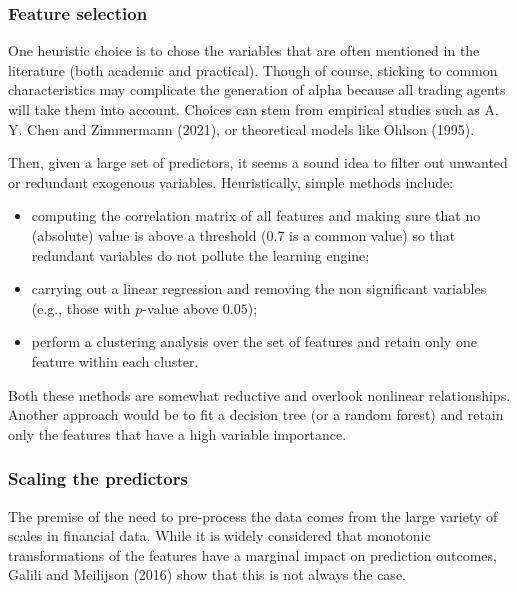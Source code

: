 \subsubsection{Feature selection}
One heuristic choice is to chose the variables that are often mentioned in the literature (both academic and practical). Though of course, sticking to common characteristics may complicate the generation of alpha because all trading agents will take them into account. Choices can stem from empirical studies such as A. Y. Chen and Zimmermann (2021), or theoretical models like Ohlson (1995). 

Then, given a large set of predictors, it seems a sound idea to filter out unwanted or redundant exogenous variables. Heuristically, simple methods include:
\begin{itemize}
    \item computing the correlation matrix of all features and making sure that no (absolute) value is above a threshold (0.7 is a common value) so that redundant variables do not pollute the learning engine;
    \item carrying out a linear regression and removing the non significant variables (e.g., those with $p$-value above $0.05$);
    \item perform a clustering analysis over the set of features and retain only one feature within each cluster.
\end{itemize}

Both these methods are somewhat reductive and overlook nonlinear relationships. Another approach would be to fit a decision tree (or a random forest) and retain only the features that have a high variable importance. 

\subsubsection{Scaling the predictors}
The premise of the need to pre-process the data comes from the large variety of scales in financial data. While it is widely considered that monotonic transformations of the features have a marginal impact on prediction outcomes, Galili and Meilijson (2016) show that this is not always the case. 

